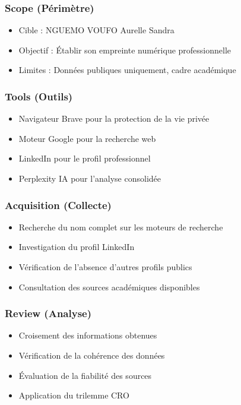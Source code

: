 \documentclass[12pt, a4paper]{article}
\begin{document}
\subsubsection{Scope (Périmètre)}
\begin{itemize}
    \item Cible : NGUEMO VOUFO Aurelle Sandra
    \item Objectif : Établir son empreinte numérique professionnelle
    \item Limites : Données publiques uniquement, cadre académique
\end{itemize}

\subsubsection{Tools (Outils)}
\begin{itemize}
    \item Navigateur Brave pour la protection de la vie privée
    \item Moteur Google pour la recherche web
    \item LinkedIn pour le profil professionnel
    \item Perplexity IA pour l'analyse consolidée
\end{itemize}

\subsubsection{Acquisition (Collecte)}
\begin{itemize}
    \item Recherche du nom complet sur les moteurs de recherche
    \item Investigation du profil LinkedIn
    \item Vérification de l'absence d'autres profils publics
    \item Consultation des sources académiques disponibles
\end{itemize}

\subsubsection{Review (Analyse)}
\begin{itemize}
    \item Croisement des informations obtenues
    \item Vérification de la cohérence des données
    \item Évaluation de la fiabilité des sources
    \item Application du trilemme CRO
\end{itemize}
\end{document}
